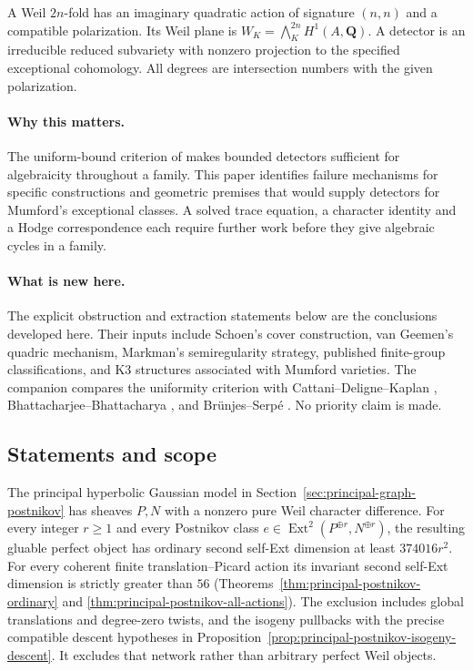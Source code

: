 \documentclass[11pt]{article}
\theoremstyle{definition}
\theoremstyle{remark}
\newcommand{\Q}{\mathbf Q}
\begin{document}
A Weil $2n$-fold has an imaginary quadratic action of signature $(n,n)$
and a compatible polarization. Its Weil plane is
$W_K=\bigwedge_K^{2n}H^1(A,\Q)$. A detector is an irreducible reduced
subvariety with nonzero projection to the specified exceptional
cohomology. All degrees are intersection numbers with the given
polarization.

\paragraph{Why this matters.}
The uniform-bound criterion of \cite{CompanionA} makes bounded
detectors sufficient for algebraicity throughout a family. This
paper identifies failure mechanisms for specific constructions and
geometric premises that would supply detectors for Mumford's
exceptional classes. A solved trace equation, a character identity
and a Hodge correspondence each require further work before they give
algebraic cycles in a family.

\paragraph{What is new here.}
The explicit obstruction and extraction statements below are the
conclusions developed here. Their inputs include Schoen's cover
construction, van Geemen's quadric mechanism, Markman's
semiregularity strategy, published finite-group classifications,
and K3 structures associated with Mumford varieties.
The companion compares the uniformity criterion with
Cattani--Deligne--Kaplan \cite[p.~483]{CDK},
Bhattacharjee--Bhattacharya
\cite[Lemmas~4.2--4.3 and Theorem~4.5]{BBDense}, and
Br\"unjes--Serp\'e \cite[Theorem~3.4]{BS}.
No priority claim is made.

\subsection{Statements and scope}

The principal hyperbolic Gaussian model in
Section~\ref{sec:principal-graph-postnikov} has sheaves $P,N$
with a nonzero pure Weil character difference. For every integer
$r\geq1$ and every Postnikov class
$e\in\operatorname{Ext}^2(P^{\oplus r},N^{\oplus r})$, the
resulting gluable perfect object has ordinary second self-Ext
dimension at least $374016r^2$. For every coherent finite
translation--Picard action its invariant second self-Ext dimension
is strictly greater than $56$
(Theorems~\ref{thm:principal-postnikov-ordinary} and
\ref{thm:principal-postnikov-all-actions}). The exclusion includes
global translations and degree-zero twists, and the isogeny
pullbacks with the precise compatible descent hypotheses in
Proposition~\ref{prop:principal-postnikov-isogeny-descent}.
It excludes that network rather than arbitrary perfect Weil objects.
\end{document}
